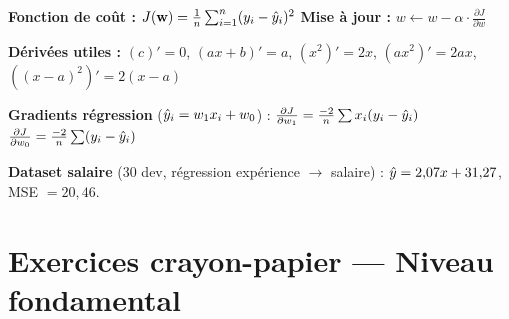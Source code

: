 %






\setlength{\parskip}{3pt}
\setlength{\abovedisplayskip}{6pt}
\setlength{\belowdisplayskip}{6pt}

\begin{tcolorbox}[
    enhanced, colback=ipssiCyan!5, colframe=ipssiCyan!50,
    boxrule=0.8pt, arc=4pt,
    title={\sffamily\bfseries Rappels --- Formules du Jour 2},
    coltitle=white, colbacktitle=ipssiCyan!70,
]
\small
\textbf{Fonction de co\^{u}t :}
$J(\mathbf{w}) = \frac{1}{n}\sum_{i=1}^{n}(y_i - \hat{y}_i)^2$
\hfill
\textbf{Mise \`{a} jour :}
$w \leftarrow w - \alpha \cdot \frac{\partial J}{\partial w}$

\medskip
\textbf{D\'{e}riv\'{e}es utiles :}
$(c)' = 0$,\quad
$(ax+b)' = a$,\quad
$(x^2)' = 2x$,\quad
$(ax^2)' = 2ax$,\quad
$((x{-}a)^2)' = 2(x{-}a)$

\medskip
\textbf{Gradients r\'{e}gression} ($\hat{y}_i = w_1 x_i + w_0$) :
$\frac{\partial J}{\partial w_1} = \frac{-2}{n}\sum x_i(y_i - \hat{y}_i)$
\hfill
$\frac{\partial J}{\partial w_0} = \frac{-2}{n}\sum (y_i - \hat{y}_i)$

\medskip
\textbf{Dataset salaire} (30 dev, r\'{e}gression exp\'{e}rience $\to$ salaire) :
$\hat{y} = 2{,}07x + 31{,}27$, MSE $= 20{,}46$.
\end{tcolorbox}

\section*{Exercices crayon-papier --- Niveau fondamental}



